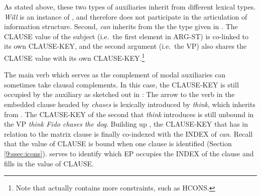 \noindent As stated above, these two types of auxiliaries inherit from
different lexical types. \textit{Will} is an instance of
, and therefore does not participate in the
articulation of information structure. Second, \textit{can} inherits
from the the type given in
. The CLAUSE value of
the subject (i.e.\ the first element in ARG-ST) is co-linked to its
own CLAUSE-KEY, and the second argument
(i.e.\ the VP) also shares the CLAUSE value with its own
CLAUSE-KEY.\footnote{Note that
   actually contains
  more constraints, such as HCONS.}





The main verb which serves as the complement of modal auxiliaries can
sometimes take clausal complements. In
this case, the CLAUSE-KEY is still occupied by the auxiliary as
sketched out in : The
arrow to the verb in the embedded clause headed by \textit{chases} is
lexically introduced by \textit{think}, which inherits from
. The CLAUSE-KEY of the second 
that \textit{think} introduces is still unbound in the VP
\textit{think Fido chases the dog}. Building up
, the CLAUSE-KEY that  has in
relation to the matrix clause is finally co-indexed with the INDEX of
\textit{can}. Recall that the value of CLAUSE is bound when one clause
is identified (Section \ref{9:ssec:icons}).  serves to
identify which EP occupies the INDEX of the clause and fills in the
value of CLAUSE.









